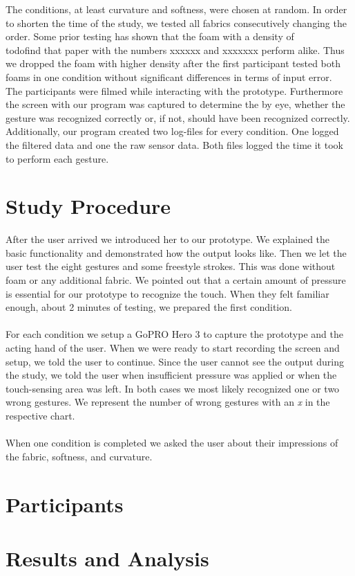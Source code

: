 The conditions, at least curvature and softness, were chosen at random. In order to shorten the time of the study, we tested all fabrics consecutively changing the order. Some prior testing has shown that the foam with a density of \\todo{find that paper with the numbers} xxxxxx and xxxxxxx perform alike. Thus we dropped the  foam with higher density after the first participant tested both foams in one condition without significant differences in terms of input error. \\

The participants were filmed while interacting with the prototype. Furthermore the screen with our program was captured to determine the by eye, whether the gesture was recognized correctly or, if not, should have been recognized correctly. Additionally, our program created two log-files for every condition. One logged the filtered data and one the raw sensor data. Both files logged the time it took to perform each gesture.

\section{Study Procedure}
After the user arrived we introduced her to our prototype. We explained the basic functionality and demonstrated how the output looks like. Then we let the user test the eight gestures and some freestyle strokes. This was done without foam or any additional fabric. We pointed out that a certain amount of pressure is essential for our prototype to recognize the touch. When they felt familiar enough, about 2 minutes of testing, we prepared the first condition. 
\\ \\
For each condition we setup a  GoPRO Hero 3 to capture the prototype and the acting hand of the user. When we were ready to start recording the screen and setup, we told the user to continue. Since the user cannot see the output during the study, we told the user when insufficient  pressure was applied or when the touch-sensing area was left. In both cases we most likely recognized one or two wrong gestures. We represent the number of wrong gestures with an \emph{x} in the respective chart. 
\\ \\
When one condition is completed we asked the user about their impressions of the fabric, softness, and curvature. 
\section{Participants}

\section{Results and Analysis}

